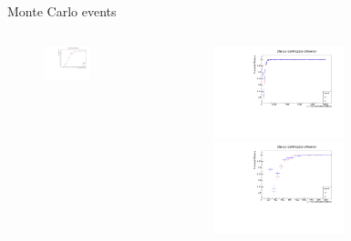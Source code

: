 \documentclass[11pt]{beamer}
\begin{document}
\begin{frame}{Monte Carlo events}
\begin{columns}[T]
\begin{column}{.48\textwidth}
\begin{figure}[h!]
			\includegraphics[width=0.6\textwidth]{FittedMuonBeamZoom.pdf}
		\end{figure}
	\end{column}%
	\begin{column}{.48\textwidth}
		\begin{figure}[h!]
			\centering
			\includegraphics[width=0.6\textwidth]{ChargeIDMuonBeam.pdf}
			
				\includegraphics[width=0.6\textwidth]{ChargeIDMuonBeamZoom.pdf}
		\end{figure}
	\end{column}%
\end{columns}

\end{frame}
\end{document}
